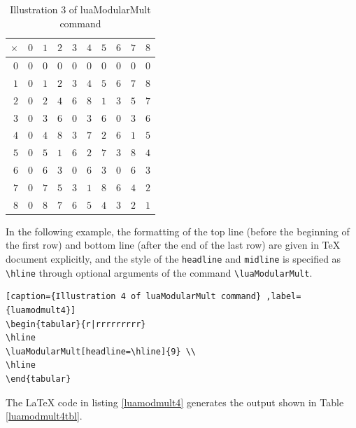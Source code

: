 ﻿\documentclass{article}
\begin{document}
\begin{table}[H]
\centering
\begin{tabular}{r|rrrrrrrrr}
$\times$ & $0$ & $1$ & $2$ & $3$ & $4$ & $5$ & $6$ & $7$ & $8$\\ \hline$0$ & $0$ & $0$ & $0$ & $0$ & $0$ & $0$ & $0$ & $0$ & $0$\\ \hline$1$ & $0$ & $1$ & $2$ & $3$ & $4$ & $5$ & $6$ & $7$ & $8$\\ \hline$2$ & $0$ & $2$ & $4$ & $6$ & $8$ & $1$ & $3$ & $5$ & $7$\\ \hline$3$ & $0$ & $3$ & $6$ & $0$ & $3$ & $6$ & $0$ & $3$ & $6$\\ \hline$4$ & $0$ & $4$ & $8$ & $3$ & $7$ & $2$ & $6$ & $1$ & $5$\\ \hline$5$ & $0$ & $5$ & $1$ & $6$ & $2$ & $7$ & $3$ & $8$ & $4$\\ \hline$6$ & $0$ & $6$ & $3$ & $0$ & $6$ & $3$ & $0$ & $6$ & $3$\\ \hline$7$ & $0$ & $7$ & $5$ & $3$ & $1$ & $8$ & $6$ & $4$ & $2$\\ \hline$8$ & $0$ & $8$ & $7$ & $6$ & $5$ & $4$ & $3$ & $2$ & $1$
\end{tabular}
\caption{Illustration 3 of luaModularMult command}
\label{luamodmult3tbl}
\end{table}


In the following example, the formatting of the top line (before the beginning of the first row) and bottom line (after the end of the last row) are given in TeX document explicitly, and  the style of the \verb|headline| and \verb|midline| is specified as \verb|\hline| through optional arguments of the command \verb|\luaModularMult|.
\begin{lstlisting}[caption={Illustration 4 of luaModularMult command} ,label={luamodmult4}]
\begin{tabular}{r|rrrrrrrrr}
\hline
\luaModularMult[headline=\hline]{9} \\
\hline
\end{tabular}
\end{lstlisting}
The LaTeX code in listing \ref{luamodmult4} generates the output shown in Table  \ref{luamodmult4tbl}.
\end{document}
